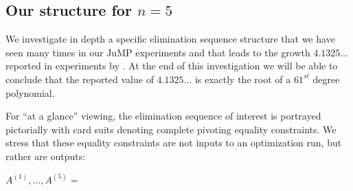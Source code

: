 \documentclass[reqno]{amsart}
\numberwithin{equation}{section}
\begin{document}
\subsection{Our   structure for $n=5$}
\label{structure5}
\def\RedSpade{\color{red}\spadesuit}
\def\mRedSpade{\color{red}-\spadesuit}
\def\RedDiamond{\color{red}\diamondsuit}
\def\mRedDiamond{\color{red}-\diamondsuit}
\def\RedClub{\color{red}\clubsuit}
\def\mRedClub{\color{red}-\clubsuit}




We investigate in depth
a specific elimination sequence structure
that we have seen many times in our JuMP experiments
and that leads to the growth $4.1325\dots$ reported in experiments by
\cite{day1988growth, gould1991growth}. 
At the end of this investigation we will be able to conclude
 that the reported value of
$4.1325\dots$ is exactly the root of a $61^{st}$ degree polynomial.

For  ``at a glance'' viewing, the elimination sequence of interest is portrayed pictorially
with card suits denoting
complete pivoting equality 
constraints.  We stress that these equality constraints
are not inputs to an optimization run, but rather
are outputs:
\vspace*{.1in}

\noindent
$A^{(1)},\ldots,A^{(5)} =  $ 
\end{document}
